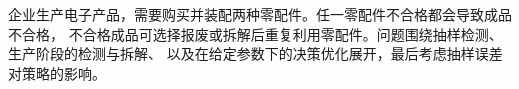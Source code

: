 企业生产电子产品，需要购买并装配两种零配件。任一零配件不合格都会导致成品不合格，
不合格成品可选择报废或拆解后重复利用零配件。问题围绕抽样检测、生产阶段的检测与拆解、
以及在给定参数下的决策优化展开，最后考虑抽样误差对策略的影响。
